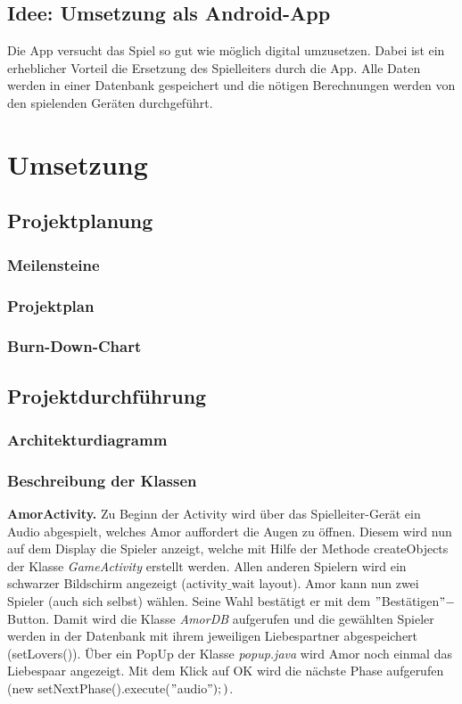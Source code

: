 \documentclass[12pt]{article}
\begin{document}
\subsection{Idee: Umsetzung als Android-App}
Die App versucht das Spiel so gut wie möglich digital umzusetzen. Dabei ist ein erheblicher Vorteil
die Ersetzung des Spielleiters durch die App. Alle Daten werden in einer Datenbank gespeichert und
die nötigen Berechnungen werden von den spielenden Geräten durchgeführt.

\section{Umsetzung}

	\subsection{Projektplanung}
		\subsubsection{Meilensteine}
		\subsubsection{Projektplan}
		\subsubsection{Burn-Down-Chart}

	\subsection{Projektdurchführung}
		\subsubsection{Architekturdiagramm}
		
		
		
		\subsubsection{Beschreibung der Klassen}
		
\textbf{AmorActivity.}
Zu Beginn der Activity wird über das Spielleiter-Gerät ein Audio abgespielt, welches Amor auffordert die Augen zu öffnen. Diesem wird nun auf dem Display die Spieler anzeigt, welche mit Hilfe der Methode createObjects der Klasse \textit{GameActivity} erstellt werden. Allen anderen Spielern wird ein schwarzer Bildschirm angezeigt (activity$\_$wait layout). Amor kann nun zwei Spieler (auch sich selbst) wählen. Seine Wahl bestätigt er mit dem $"$Bestätigen$" -$ Button. Damit wird die Klasse \textit{AmorDB} aufgerufen und die gewählten Spieler werden in der Datenbank mit ihrem jeweiligen Liebespartner abgespeichert (setLovers()).
Über ein PopUp der Klasse \textit{popup.java} wird Amor noch einmal das Liebespaar angezeigt. Mit dem Klick auf OK wird die nächste Phase aufgerufen (new setNextPhase().execute($"$audio$");)$.
\end{document}

